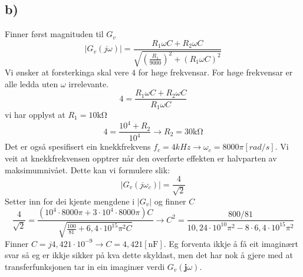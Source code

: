 \documentclass[12pt,a4paper]{article}
\begin{document}
    \subsection*{b)}
    Finner først magnituden til $G_v$
    \begin{equation}
      |G_v(j\omega)| = \frac{R_1\omega C + R_2\omega C}
      {\sqrt{\left(\frac{R_1}{9000}\right)^2 + (R_1\omega C)^2}}
    \end{equation}
    Vi ønsker at forsterkinga skal vere $4$ for høge frekvensar. For høge frekvensar
    er alle ledda uten $\omega$ irrelevante.
    \begin{equation}
      4 = \frac{R_1\omega C + R_2 \omega C}{R_1 \omega C}
    \end{equation}
    vi har opplyst at $R_1 = 10\si{\kilo\ohm}$
    \begin{equation}
      4 = \frac{10^4 + R_2}{10^4} \rightarrow R_2 = 30\si{\kilo\ohm}
    \end{equation}
    Det er også spesifisert ein knekkfrekvens $f_c = 4kHz \rightarrow \omega_c = 8000\pi[rad/s]$.
    Vi veit at knekkfrekvensen opptrer når den overførte effekten er halvparten av
    maksimumnivået. Dette kan vi formulere slik:
    \begin{equation}
      |G_v(j\omega_c)| = \frac{4}{\sqrt{2}}
    \end{equation}
    Setter inn for dei kjente mengdene i $|G_v|$ og finner $C$
    \begin{equation}
      \frac{4}{\sqrt{2}} = \frac{(10^4\cdot 8000\pi + 3\cdot 10^4 \cdot 8000 \pi)C}
      {\sqrt{\frac{100}{81} + 6,4\cdot 10^{15} \pi^2C}} \rightarrow
      C^2 = \frac{800/81}{10,24\cdot10^{10}\pi^2 - 8\cdot6,4\cdot 10^{15}\pi^2}
    \end{equation}
    Finner $C = j4,421 \cdot 10^{-9} \rightarrow C = 4,421[\si{\nano\farad}]$. Eg forventa ikkje
    å få eit imaginært svar så eg er ikkje sikker på kva dette skyldast, men det har nok å gjere
    med at transferfunksjonen tar in ein imaginær verdi $G_v(\textbf{j}\omega)$.
\end{document}
